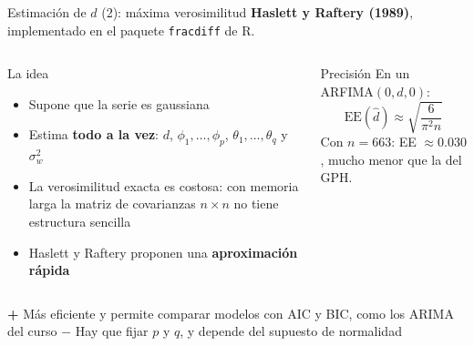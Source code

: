 \documentclass[aspectratio=169,11pt]{beamer}
\newcommand{\destacar}[1]{\textcolor{udeaverde}{\textbf{#1}}}
\begin{document}
\begin{frame}{Estimación de $d$ (2): máxima verosimilitud}
\textbf{Haslett y Raftery (1989)}, implementado en el paquete \texttt{fracdiff} de R.
\begin{columns}[T]
\begin{block}{La idea}
\begin{itemize}
\item Supone que la serie es gaussiana
\item Estima \destacar{todo a la vez}: $d$, $\phi_1,\ldots,\phi_p$, $\theta_1,\ldots,\theta_q$ y $\sigma_w^2$
\item La verosimilitud exacta es costosa: con memoria larga la matriz de covarianzas $n\times n$ no tiene estructura sencilla
\item Haslett y Raftery proponen una \destacar{aproximación rápida}
\end{itemize}
\end{block}
\begin{block}{Precisión}
En un ARFIMA$(0,d,0)$:
\[
\text{EE}(\hat d) \approx \sqrt{\frac{6}{\pi^2 n}}
\]
Con $n = 663$: \;EE $\approx 0.030$, mucho menor que la del GPH.
\end{block}
\end{columns}
\vspace{0.2cm}
\begin{columns}[T]
\textcolor{udeaverde}{\textbf{+}} Más eficiente y permite comparar modelos con AIC y BIC, como los ARIMA del curso
\textcolor{rojo}{\textbf{$-$}} Hay que fijar $p$ y $q$, y depende del supuesto de normalidad
\end{columns}
\end{frame}

\end{document}

